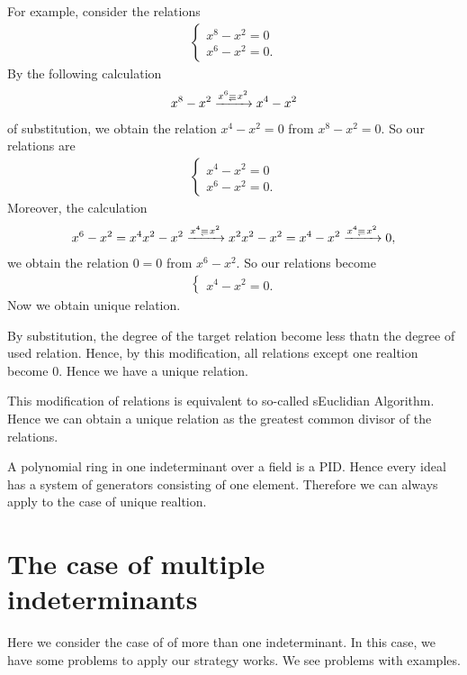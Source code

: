 For example, consider the relations
\begin{align*}
  \begin{cases}
    x^8-x^2=0\\
    x^6-x^2=0.
  \end{cases}
\end{align*}
By the following calculation
\begin{align*}
x^8-x^2  \xrightarrow{x^6\Denotes x^2} x^{4}-x^2
\end{align*}
of substitution,
we obtain the relation $x^{4}-x^2=0$
from $x^8-x^2=0$.
So our relations are
\begin{align*}
  \begin{cases}
    x^4-x^2=0\\
    x^6-x^2=0.
  \end{cases}
\end{align*}
Moreover,
the calculation
\begin{align*}
x^6-x^2=x^{4}x^{2}-x^2  \xrightarrow{x^4\Denotes x^2} x^2x^2-x^2=x^{4}-x^2  \xrightarrow{x^4\Denotes x^2} 0,
\end{align*}
we obtain the relation $0=0$
from
$x^6-x^2$.
So our relations become
\begin{align*}
  \begin{cases}
    x^4-x^2=0.
  \end{cases}
\end{align*}
Now we obtain unique relation.

\begin{remark}
  By substitution,
  the degree of the target relation become less thatn
  the degree of used relation.
  Hence, by this modification,
  all relations except one realtion become $0$.
  Hence we have a unique relation.
\end{remark}
\begin{remark}
  This modification of relations
  is equivalent to so-called sEuclidian Algorithm.
  Hence we can obtain a unique relation as
  the greatest common divisor of the relations.
\end{remark}
\begin{remark}
    A polynomial ring in one indeterminant over a field is a PID.
    Hence every ideal has a system of generators consisting of
    one element.
    Therefore we can always apply to the case of unique realtion.
\end{remark}



\section{The case of multiple indeterminants}
Here we consider the case of  of more than one indeterminant.
In this case, we have some problems
to apply our strategy works.
We see problems with examples.
